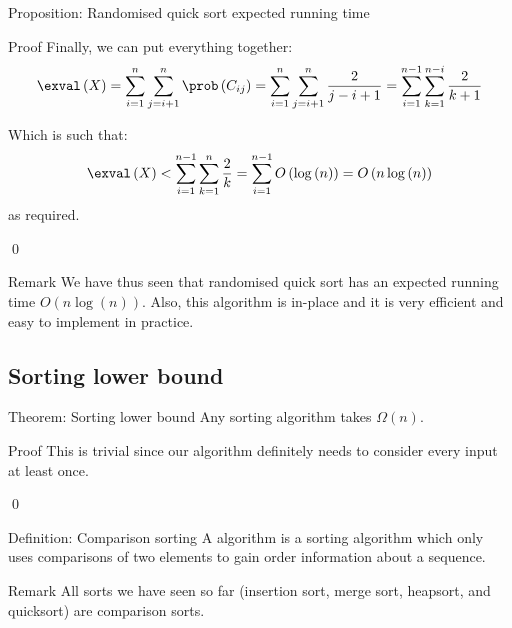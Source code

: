\documentclass[a4paper]{article}
\begin{document}
\begin{parag}{Proposition: Randomised quick sort expected running time}
\begin{subparag}{Proof}
        Finally, we can put everything together: 
        \[\exval\left(X\right) = \sum_{i=1}^{n} \sum_{j=i+1}^{n} \prob\left(C_{ij}\right) = \sum_{i=1}^{n} \sum_{j=i+1}^{n} \frac{2}{j - i + 1} = \sum_{i=1}^{n-1} \sum_{k=1}^{n-i} \frac{2}{k+1}\]

        Which is such that:
        \[\exval\left(X\right) < \sum_{i=1}^{n-1} \sum_{k=1}^{n} \frac{2}{k} = \sum_{i=1}^{n-1} O\left(\log\left(n\right)\right) = O\left(n\log\left(n\right)\right)\]
        as required.

        \qed
    \end{subparag}
\end{parag}

\begin{parag}{Remark}
    We have thus seen that randomised quick sort has an expected running time $O\left(n\log\left(n\right)\right)$. Also, this algorithm is in-place and it is very efficient and easy to implement in practice.
\end{parag}

\subsection{Sorting lower bound}
\begin{parag}{Theorem: Sorting lower bound}
    Any sorting algorithm takes $\Omega\left(n\right)$.

    \begin{subparag}{Proof}
        This is trivial since our algorithm definitely needs to consider every input at least once.

        \qed
    \end{subparag}
    
\end{parag}

\begin{parag}{Definition: Comparison sorting}
    A  algorithm is a sorting algorithm which only uses comparisons of two elements to gain order information about a sequence. 

    \begin{subparag}{Remark}
        All sorts we have seen so far (insertion sort, merge sort, heapsort, and quicksort) are comparison sorts.
    \end{subparag}
\end{parag}
\end{document}

